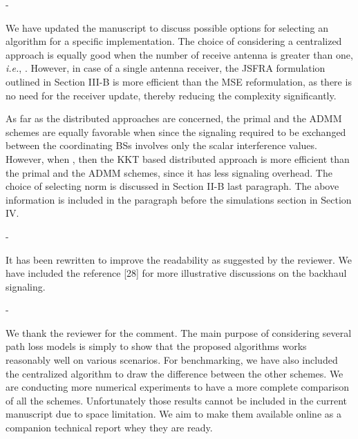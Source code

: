 \begin{enumerate}
\begin{enumerate}
	 - 
	
	\resp We have updated the manuscript to discuss possible options for selecting an algorithm for a specific implementation. The choice of considering a centralized approach is equally good when the number of receive antenna is greater than one, \textit{i.e.}, . However, in case of a single antenna receiver, the \ac{JSFRA} formulation outlined in Section III-B is more efficient than the \ac{MSE} reformulation, as there is no need for the receiver update, thereby reducing the complexity significantly. 
	
	As far as the distributed approaches are concerned, the primal and the \ac{ADMM} schemes are equally favorable when  since the signaling required to be exchanged between the coordinating \acp{BS} involves only the scalar interference values. However, when , then the \ac{KKT} based distributed approach is more efficient than the primal and the \ac{ADMM} schemes, since it has less signaling overhead. The choice of selecting  norm is discussed in Section II-B last paragraph. The above information is included in the paragraph before the simulations section in Section IV.
	
	 - 
	
	\resp It has been rewritten to improve the readability as suggested by the reviewer. We have included the reference [28] for more illustrative discussions on the backhaul signaling.
	
	 - 
	
	\resp We thank the reviewer for the comment. The main purpose of considering several path loss models is simply to show that the proposed algorithms works reasonably well on various scenarios. For benchmarking, we have also included the centralized algorithm to draw the difference between the other schemes. We are conducting more numerical experiments to have a more complete comparison of all the schemes. Unfortunately those results cannot be included in the current manuscript due to space limitation. We aim to make them available online as a companion technical report whey they are ready.
	

\end{enumerate}
\end{enumerate}
